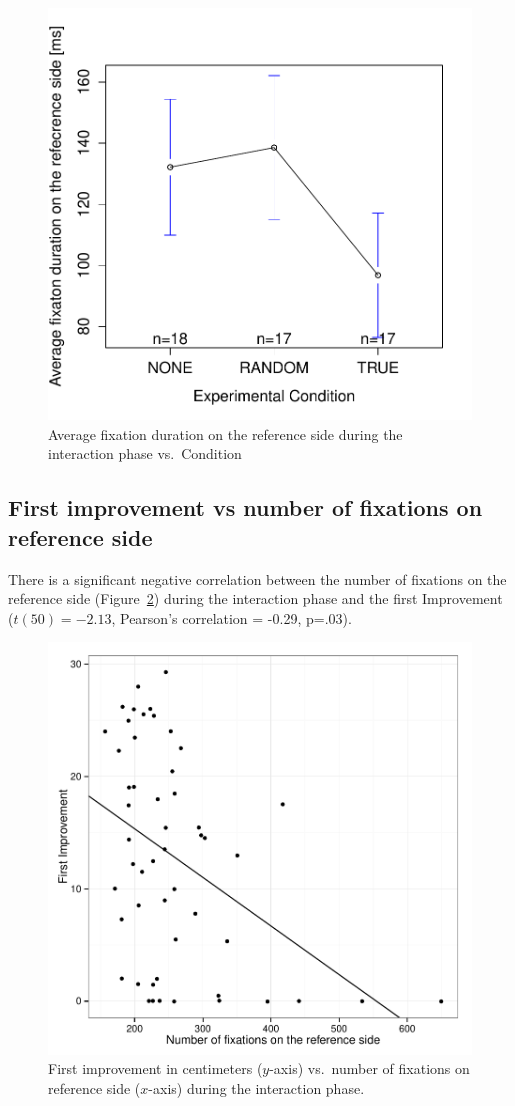 \documentclass{sig-alternate}
\begin{document}
\begin{figure}[h!]
    \centering
    \includegraphics[width=0.8\linewidth]{meanPlotFixReference}
    \caption{Average fixation duration on the reference side during the
    interaction phase vs.~Condition}
    \label{res3}
\end{figure}

\subsection{First improvement vs number of fixations on reference side}

There is a significant negative correlation between the number of
fixations on the reference side (Figure~\ref{res4}) during the interaction phase
and the first Improvement ($t(50)=-2.13$, Pearson's correlation = -0.29, p=.03).

\begin{figure}[h!]
    \centering
    \includegraphics[width=0.8\linewidth]{corPlotFirstImprove}
    \caption{First improvement in centimeters ($y$-axis) vs.~number of fixations
    on reference side ($x$-axis) during the interaction phase.}
    \label{res4}
\end{figure}
\end{document}
